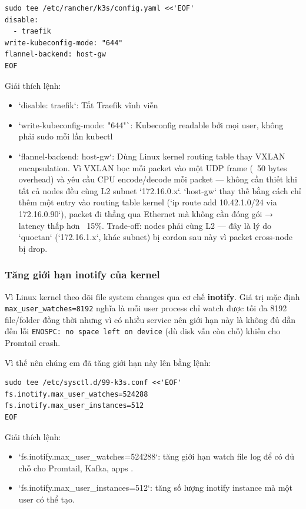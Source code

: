 \begin{verbatim}
sudo tee /etc/rancher/k3s/config.yaml <<'EOF'
disable:
  - traefik
write-kubeconfig-mode: "644"
flannel-backend: host-gw
EOF
\end{verbatim}
Giải thích lệnh:
\begin{itemize}
    \item `disable: traefik`: Tắt Traefik vĩnh viễn
    \item `write-kubeconfig-mode: "644"`: Kubeconfig readable bởi mọi user, không phải sudo mỗi lần kubectl
    \item `flannel-backend: host-gw`: Dùng Linux kernel routing table thay VXLAN encapsulation. Vì VXLAN bọc mỗi packet vào một UDP frame (~50 bytes overhead) và yêu cầu CPU encode/decode mỗi packet — không cần thiết khi tất cả nodes đều cùng L2 subnet `172.16.0.x`. `host-gw` thay thế bằng cách chỉ thêm một entry vào routing table kernel (`ip route add 10.42.1.0/24 via 172.16.0.90`), packet đi thẳng qua Ethernet mà không cần đóng gói → latency thấp hơn ~15\%. Trade-off: nodes phải cùng L2 — đây là lý do `quoctan` (`172.16.1.x`, khác subnet) bị cordon sau này vì packet cross-node bị drop.
\end{itemize}

\subsubsection{Tăng giới hạn inotify của kernel}
Vì Linux kernel theo dõi file system changes qua cơ chế \textbf{inotify}. Giá trị mặc định \texttt{max\_user\_watches=8192} nghĩa là mỗi user process chỉ watch được tối đa 8192 file/folder đồng thời nhưng vì có nhiều service nên giới hạn này là không đủ dẫn đến lỗi \texttt{ENOSPC: no space left on device} (dù disk vẫn còn chỗ) khiến cho Promtail crash.

Vì thế nên chúng em đã tăng giới hạn này lên bằng lệnh:
\begin{verbatim}
sudo tee /etc/sysctl.d/99-k3s.conf <<'EOF'
fs.inotify.max_user_watches=524288
fs.inotify.max_user_instances=512
EOF
\end{verbatim}

Giải thích lệnh:
\begin{itemize}
    \item `fs.inotify.max\_user\_watches=524288`: tăng giới hạn watch file log để có đủ chỗ cho Promtail, Kafka, apps .
    \item  `fs.inotify.max\_user\_instances=512`: tăng số lượng inotify instance mà một user có thể tạo.
\end{itemize}

